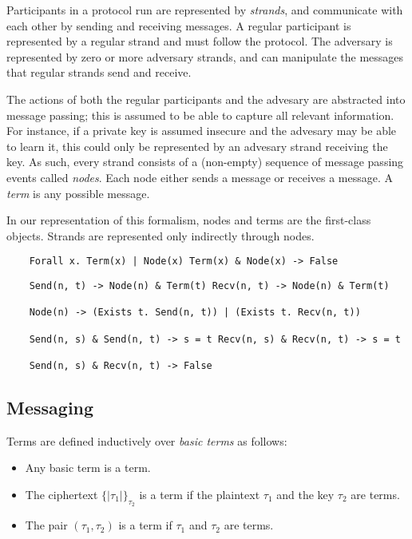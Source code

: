 \documentclass[12pt]{article}
\newcommand{\enc}[2]{\{|#1|\}_{#2}}
\newcommand{\pair}[2]{(#1, #2)}
\begin{document}
  Participants in a protocol run are represented by \emph{strands},
  and communicate with each other by sending and receiving messages. A
  regular participant is represented by a regular strand and must
  follow the protocol. The adversary is represented by zero or more
  adversary strands, and can manipulate the messages that regular
  strands send and receive.

  The actions of both the regular participants and the advesary are
  abstracted into message passing; this is assumed to be able to
  capture all relevant information. For instance, if a private key is
  assumed insecure and the advesary may be able to learn it, this
  could only be represented by an advesary strand receiving the
  key. As such, every strand consists of a (non-empty) sequence of
  message passing events called \emph{nodes}. Each node either sends a
  message or receives a message. A \emph{term} is any possible
  message.

  In our representation of this formalism, nodes and terms are the
  first-class objects. Strands are represented only indirectly through
  nodes.

\begin{verbatim}
    Forall x. Term(x) | Node(x) Term(x) & Node(x) -> False
\end{verbatim}

\begin{verbatim}
    Send(n, t) -> Node(n) & Term(t) Recv(n, t) -> Node(n) & Term(t)

    Node(n) -> (Exists t. Send(n, t)) | (Exists t. Recv(n, t))

    Send(n, s) & Send(n, t) -> s = t Recv(n, s) & Recv(n, t) -> s = t

    Send(n, s) & Recv(n, t) -> False
\end{verbatim}

\subsection{Messaging}

  Terms are defined inductively over \emph{basic terms} as follows:

  \begin{itemize}
  \item Any basic term is a term.
  \item The ciphertext $\enc{\tau_1}{\tau_2}$ is a term if the
    plaintext $\tau_1$ and the key $\tau_2$ are terms.
  \item The pair $\pair{\tau_1}{\tau_2}$ is a term if $\tau_1$ and
    $\tau_2$ are terms.
  \end{itemize}
\end{document}
